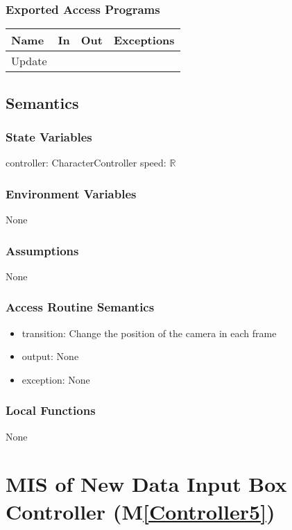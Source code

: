 \documentclass[12pt, titlepage]{article}
\newcommand{\mref}[1]{M\ref{#1}}
\begin{document}
\subsubsection{Exported Access Programs}
\begin{center}
\begin{tabular}{|p{3cm}|p{4cm}|p{4cm}| p{5cm}|}
\hline
\textbf{Name} & \textbf{In} & \textbf{Out} & \textbf{Exceptions} \\
\hline
 Update& &  & \\
\hline
\end{tabular}
\end{center}

\subsection{Semantics}
\subsubsection{State Variables}
controller: CharacterController
speed: $\mathbb{R}$

\subsubsection{Environment Variables}
None

\subsubsection{Assumptions}
None

\subsubsection{Access Routine Semantics}
\begin{itemize}
    \item transition: Change the position of the camera in each frame
    \item output: None
    \item exception: None
\end{itemize}
\subsubsection{Local Functions}
None
\newpage

\section{MIS of New Data Input Box Controller  (\mref{Controller5})} 
\end{document}
